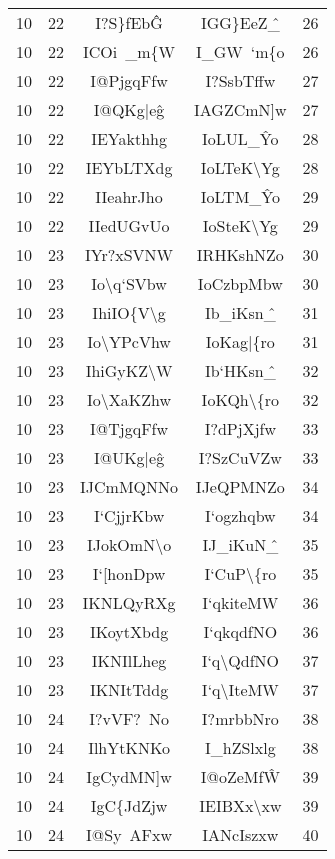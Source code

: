 \begin{longtable}{ | c | c || c | c | c | }
\hline
10 & 22 & I?S\}fEb\^G & IGG\}EeZ\^\_ & 26 \\
10 & 22 & ICOi~\_m\{W & I\_GW~`m\{o & 26 \\
\hline
10 & 22 & I@PjgqFfw & I?SsbTffw & 27 \\
10 & 22 & I@QKg|e\^g & IAGZCmN]w & 27 \\
\hline
10 & 22 & IEYakthhg & IoLUL\_\^Yo & 28 \\
10 & 22 & IEYbLTXdg & IoLTeK\textbackslash Yg & 28 \\
\hline
10 & 22 & IIeahrJho & IoLTM\_\^Yo & 29 \\
10 & 22 & IIedUGvUo & IoSteK\textbackslash Yg & 29 \\
\hline
\hline
10 & 23 & IYr?xSVNW & IRHKshNZo & 30 \\
10 & 23 & Io\textbackslash q`SVbw & IoCzbpMbw & 30 \\
\hline
10 & 23 & IhiIO\{V\textbackslash g & Ib\_iKsn\^\_ & 31 \\
10 & 23 & Io\textbackslash YPcVhw & IoKag|\{ro & 31 \\
\hline
10 & 23 & IhiGyKZ\textbackslash W & Ib`HKsn\^\_ & 32 \\
10 & 23 & Io\textbackslash XaKZhw & IoKQh\textbackslash \{ro & 32 \\
\hline
10 & 23 & I@TjgqFfw & I?dPjXjfw & 33 \\
10 & 23 & I@UKg|e\^g & I?SzCuVZw & 33 \\
\hline
10 & 23 & IJCmMQNNo & IJeQPMNZo & 34 \\
10 & 23 & I`CjjrKbw & I`ogzhqbw & 34 \\
\hline
10 & 23 & IJokOmN\textbackslash o & IJ\_iKuN\^\_ & 35 \\
10 & 23 & I`[honDpw & I`CuP\textbackslash \{ro & 35 \\
\hline
10 & 23 & IKNLQyRXg & I`qkiteMW & 36 \\
10 & 23 & IKoytXbdg & I`qkqdfNO & 36 \\
\hline
10 & 23 & IKNIlLheg & I`q\textbackslash QdfNO & 37 \\
10 & 23 & IKNItTddg & I`q\textbackslash IteMW & 37 \\
\hline
\hline
10 & 24 & I?vVF?~No & I?mrbbNro & 38 \\
10 & 24 & IlhYtKNKo & I\_hZSlxlg & 38 \\
\hline
10 & 24 & IgCydMN]w & I@oZeMf\^W & 39 \\
10 & 24 & IgC\{JdZjw & IEIBXx\textbackslash xw & 39 \\
\hline
10 & 24 & I@Sy~AFxw & IANcIszxw & 40 \\

\end{longtable}
